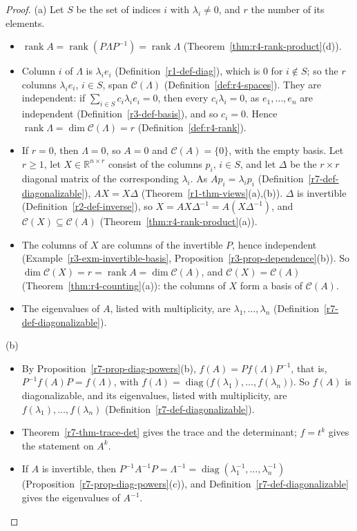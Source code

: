 \documentclass[12pt]{article}
\newcommand{\R}{\mathbb R}
\DeclareMathOperator{\diag}{diag}
\DeclareMathOperator{\rank}{rank}
\theoremstyle{definition}
\begin{document}
\begin{proof}
(a) Let \(S\) be the set of indices \(i\) with \(\lambda_i\ne0\), and \(r\) the number of its elements.
\begin{itemize}
\item \(\rank A=\rank(P\Lambda P^{-1})=\rank\Lambda\) (Theorem~\ref{thm:r4-rank-product}(d)).
\item Column \(i\) of \(\Lambda\) is \(\lambda_ie_i\) (Definition~\ref{r1-def-diag}), which is \(0\) for \(i\notin S\); so the \(r\)
columns \(\lambda_ie_i\), \(i\in S\), span \(\mathcal C(\Lambda)\) (Definition~\ref{def:r4-spaces}). They are independent: if
\(\sum_{i\in S}c_i\lambda_ie_i=0\), then every \(c_i\lambda_i=0\), as \(e_1,\dots,e_n\) are independent
(Definition~\ref{r3-def-basis}), and so \(c_i=0\). Hence \(\rank\Lambda=\dim\mathcal C(\Lambda)=r\)
(Definition~\ref{def:r4-rank}).
\item If \(r=0\), then \(\Lambda=0\), so \(A=0\) and \(\mathcal C(A)=\{0\}\), with the empty basis. Let \(r\geqslant1\), let \(X\in\R^{n\times r}\)
consist of the columns \(p_i\), \(i\in S\), and let \(\Delta\) be the \(r\times r\) diagonal matrix of the corresponding
\(\lambda_i\). As \(Ap_i=\lambda_ip_i\) (Definition~\ref{r7-def-diagonalizable}), \(AX=X\Delta\)
(Theorem~\ref{r1-thm-views}(a),(b)). \(\Delta\) is invertible (Definition~\ref{r2-def-inverse}), so
\(X=AX\Delta^{-1}=A(X\Delta^{-1})\), and \(\mathcal C(X)\subseteq\mathcal C(A)\) (Theorem~\ref{thm:r4-rank-product}(a)).
\item The columns of \(X\) are columns of the invertible \(P\), hence independent (Example~\ref{r3-exm-invertible-basis},
Proposition~\ref{r3-prop-dependence}(b)). So \(\dim\mathcal C(X)=r=\rank A=\dim\mathcal C(A)\), and
\(\mathcal C(X)=\mathcal C(A)\) (Theorem~\ref{thm:r4-counting}(a)): the columns of \(X\) form a basis of \(\mathcal C(A)\).
\item The eigenvalues of \(A\), listed with multiplicity, are \(\lambda_1,\dots,\lambda_n\)
(Definition~\ref{r7-def-diagonalizable}).
\end{itemize}
(b)
\begin{itemize}
\item By Proposition~\ref{r7-prop-diag-powers}(b), \(f(A)=Pf(\Lambda)P^{-1}\), that is, \(P^{-1}f(A)P=f(\Lambda)\), with
\(f(\Lambda)=\diag\bigl(f(\lambda_1),\dots,f(\lambda_n)\bigr)\). So \(f(A)\) is diagonalizable, and its eigenvalues, listed
with multiplicity, are \(f(\lambda_1),\dots,f(\lambda_n)\) (Definition~\ref{r7-def-diagonalizable}).
\item Theorem~\ref{r7-thm-trace-det} gives the trace and the determinant; \(f=t^k\) gives the statement on \(A^k\).
\item If \(A\) is invertible, then \(P^{-1}A^{-1}P=\Lambda^{-1}=\diag(\lambda_1^{-1},\dots,\lambda_n^{-1})\)
(Proposition~\ref{r7-prop-diag-powers}(c)), and Definition~\ref{r7-def-diagonalizable} gives the eigenvalues of
\(A^{-1}\).\qedhere
\end{itemize}
\end{proof}
\end{document}
